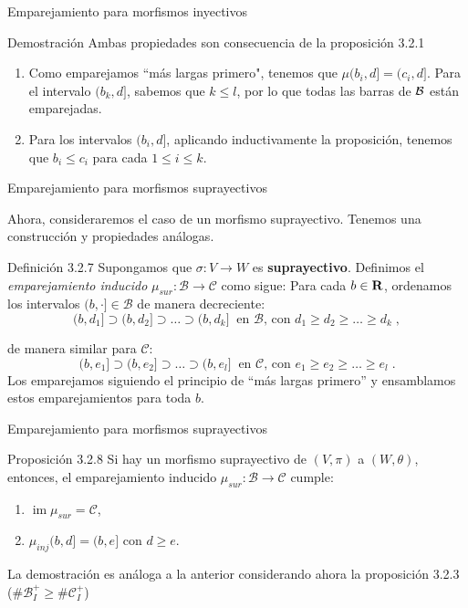 \documentclass{beamer}
\newcommand{\calB}{{\mathcal{B}}}
\newcommand{\calC}{{\mathcal{C}}}
\DeclareMathOperator{\im}{im}
\def\R\re
\def \R{{\bf R}}
\def \re{{\mathbb R}}
\begin{document}
\begin{frame}{Emparejamiento para morfismos inyectivos}
\begin{block}{Demostración}
Ambas propiedades son consecuencia de la proposición 3.2.1
\pause
\begin{enumerate}[(1)]
		\item
			Como emparejamos ``más largas primero", tenemos que $\mu (b_i,d] = (c_i, d]$. Para el intervalo $(b_k,d]$, sabemos que $k\leq l$, por lo que todas las barras de $\cal B$ están emparejadas.
   \pause
		\item
			 Para los intervalos $(b_i, d]$, aplicando inductivamente la proposición, tenemos que $b_i \leq c_i$ para cada $1\leq i\leq k$.
	\end{enumerate}
		
\end{block}
\end{frame}
\begin{frame}{Emparejamiento para morfismos suprayectivos}

Ahora, consideraremos el caso de un morfismo suprayectivo. Tenemos una construcción y propiedades análogas.
\pause


\begin{block}{Definición 3.2.7}
Supongamos que $\sigma: V \to W$ es \textbf{suprayectivo}.
	Definimos el \emph{emparejamiento inducido} $\mu_{sur}: \calB \to \calC$ como sigue:
	Para cada $b\in \R$, ordenamos los intervalos $(b, \cdot] \in \calB$ de manera decreciente:
	$$
	(b, d_1] \supset (b, d_2] \supset \ldots \supset (b, d_k] \ \text{ en $\calB$, con } d_1\geq d_2 \geq \ldots \geq d_k \;,
	$$
	
 \pause
	de manera similar para $\calC$:
	$$
	(b, e_1] \supset (b, e_2] \supset \ldots \supset (b, e_l] \ \text{ en $\calC$, con } e_1\geq e_2 \geq \ldots \geq e_l \;.
	$$
\pause
Los emparejamos siguiendo el principio de ``más largas primero'' y ensamblamos estos emparejamientos para toda $b$.

 \end{block}
 \end{frame}


\begin{frame}{Emparejamiento para morfismos suprayectivos}
\begin{block}{Proposición 3.2.8}
		Si hay un morfismo suprayectivo de $(V, \pi)$ a $(W, \theta)$, entonces, el emparejamiento inducido $\mu_{sur}: \calB \to \calC$ cumple:
	\begin{enumerate}[(1)]
		\item
			$\im \mu_{sur} = \calC$,
   \pause
		\item
			$\mu_{inj} (b,d] = (b,e]$ con $d\geq e$.
	\end{enumerate}	
\end{block}
\pause
La demostración es análoga a la anterior considerando ahora la proposición 3.2.3 (\(\#\mathcal{B}^+_I\geq\#\mathcal{C}^+_I\))
\end{frame}
\end{document}
